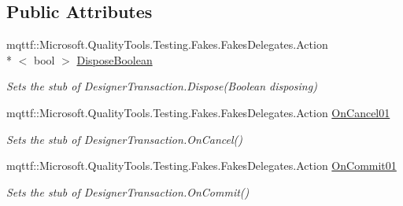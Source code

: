 \subsection*{Public Attributes}
\begin{DoxyCompactItemize}
\item 
mqttf\-::\-Microsoft.\-Quality\-Tools.\-Testing.\-Fakes.\-Fakes\-Delegates.\-Action\\*
$<$ bool $>$ \hyperlink{class_system_1_1_component_model_1_1_design_1_1_fakes_1_1_stub_designer_transaction_a1e5cc6db5cb138b3dd5a688d9ca218ca}{Dispose\-Boolean}
\begin{DoxyCompactList}\small\item\em Sets the stub of Designer\-Transaction.\-Dispose(\-Boolean disposing)\end{DoxyCompactList}\item 
mqttf\-::\-Microsoft.\-Quality\-Tools.\-Testing.\-Fakes.\-Fakes\-Delegates.\-Action \hyperlink{class_system_1_1_component_model_1_1_design_1_1_fakes_1_1_stub_designer_transaction_ab1daaddd59e5e735c615ad9fac0c1bc9}{On\-Cancel01}
\begin{DoxyCompactList}\small\item\em Sets the stub of Designer\-Transaction.\-On\-Cancel()\end{DoxyCompactList}\item 
mqttf\-::\-Microsoft.\-Quality\-Tools.\-Testing.\-Fakes.\-Fakes\-Delegates.\-Action \hyperlink{class_system_1_1_component_model_1_1_design_1_1_fakes_1_1_stub_designer_transaction_a97bd0f10951aabbc7281b86a26c06b85}{On\-Commit01}
\begin{DoxyCompactList}\small\item\em Sets the stub of Designer\-Transaction.\-On\-Commit()\end{DoxyCompactList}\end{DoxyCompactItemize}
